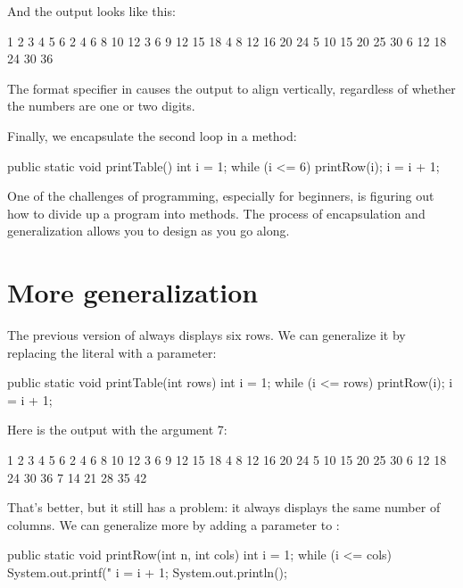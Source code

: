 And the output looks like this:

\begin{stdout}
   1   2   3   4   5   6
   2   4   6   8  10  12
   3   6   9  12  15  18
   4   8  12  16  20  24
   5  10  15  20  25  30
   6  12  18  24  30  36
\end{stdout}

The format specifier  in  causes the output to align vertically, regardless of whether the numbers are one or two digits.

Finally, we encapsulate the second loop in a method:

\begin{code}
public static void printTable() {
    int i = 1;
    while (i <= 6) {
        printRow(i);
        i = i + 1;
    }
}
\end{code}

One of the challenges of programming, especially for beginners, is figuring out how to divide up a program into methods.
The process of encapsulation and generalization allows you to design as you go along.


\section{More generalization}


The previous version of  always displays six rows.
We can generalize it by replacing the literal  with a parameter:

\begin{code}
public static void printTable(int rows) {
    int i = 1;
    while (i <= rows) {
        printRow(i);
        i = i + 1;
    }
}
\end{code}

Here is the output with the argument 7:

\begin{stdout}
   1   2   3   4   5   6
   2   4   6   8  10  12
   3   6   9  12  15  18
   4   8  12  16  20  24
   5  10  15  20  25  30
   6  12  18  24  30  36
   7  14  21  28  35  42
\end{stdout}

That's better, but it still has a problem: it always displays the same number of columns.
We can generalize more by adding a parameter to :

\begin{code}
public static void printRow(int n, int cols) {
    int i = 1;
    while (i <= cols) {
        System.out.printf("%
        i = i + 1;
    }
    System.out.println();
}
\end{code}

